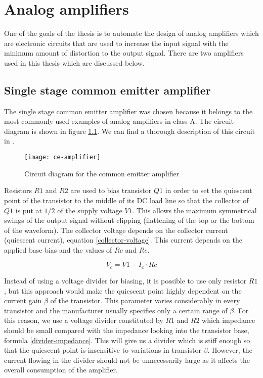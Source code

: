 \chapter{Analog amplifiers}
One of the goals of the thesis is to automate the design of analog amplifiers which are electronic circuits that are used to increase the input signal with the minimum amount of distortion to the output signal. There are two amplifiers used in this thesis which are discussed below.

\section{Single stage common emitter amplifier} \label{ce-amp}
The single stage common emitter amplifier was chosen because it belongs to the most commonly used examples of analog amplifiers in class A. The circuit diagram is shown in figure \ref{ce-amplifier}. We can find a thorough description of this circuit in \cite{the-art-of-electronics}.

\begin{figure}[H]
    \centering
    \texttt{[image: ce-amplifier]}
    \label{ce-amplifier}
    \caption{Circuit diagram for the common emitter amplifier}
\end{figure}

Resistors $R1$ and $R2$ are used to bias transistor $Q1$ in order to set the quiescent point of the transistor to the middle of its DC load line so that the collector of $Q1$ is put at $1/2$ of the supply voltage $V1$. This allows the maximum symmetrical swings of the output signal without clipping (flattening of the top or the bottom of the waveform). The collector voltage depends on the collector current (quiescent current), equation \ref{collector-voltage}. This current depends on the applied base bias and the values of $Rc$ and $Re$.

\begin{equation} \label{collector-voltage}
    V_c = V1 - I_c \cdot Rc
\end{equation}

Instead of using a voltage divider for biasing, it is possible to use only resistor $R1$, but this approach would make the quiescent point highly dependent on the current gain $\beta$ of the transistor. This parameter varies considerably in every transistor and the manufacturer usually specifies only a certain range of $\beta$. For this reason, we use a voltage divider constituted by $R1$ and $R2$ which impedance should be small compared with the impedance looking into the transistor base, formula \ref{divider-impedance}. This will give us a divider which is stiff enough so that the quiescent point is insensitive to variations in transistor $\beta$. However, the current flowing in the divider should not be unnecessarily large as it affects the overall consumption of the amplifier.

